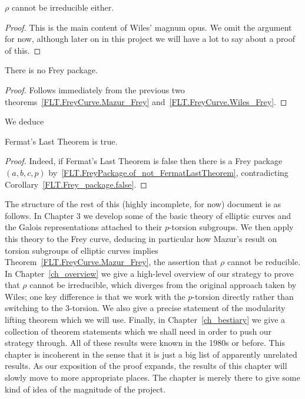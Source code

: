 \begin{theorem}\label{FLT.FreyCurve.Wiles_Frey}\leanok $\rho$ cannot be irreducible either.\end{theorem}
\begin{proof}\tangled This is the main content of Wiles' magnum opus. We omit the argument for now, although later on in this project we will have a lot to say about a proof of this.
\end{proof}

\begin{corollary}\label{FLT.Frey_package.false}\leanok There is no Frey package.\end{corollary}
\begin{proof}\leanok Follows immediately from the previous two theorems~\ref{FLT.FreyCurve.Mazur_Frey} and~\ref{FLT.FreyCurve.Wiles_Frey}.\end{proof}

We deduce

\begin{corollary}\label{FLT}\leanok Fermat's Last Theorem is true.\end{corollary}
\begin{proof}\leanok
Indeed, if Fermat's Last Theorem is false then there is a Frey package $(a,b,c,p)$ by~\ref{FLT.FreyPackage.of_not_FermatLastTheorem}, contradicting Corollary~\ref{FLT.Frey_package.false}.
\end{proof}

The structure of the rest of this (highly incomplete, for now) document is as follows. In Chapter 3 we develop some of the basic theory of elliptic curves and the Galois representations attached to their $p$-torsion subgroups. We then apply this theory to the Frey curve, deducing in particular how Mazur's result on torsion subgroups of elliptic curves implies Theorem~\ref{FLT.FreyCurve.Mazur_Frey}, the assertion that $\rho$ cannot be reducible. In Chapter~\ref{ch_overview} we give a high-level overview of our strategy to prove that $\rho$ cannot be irreducible, which diverges from the original approach taken by Wiles; one key difference is that we work with the $p$-torsion directly rather than switching to the 3-torsion. We also give a precise statement of the modularity lifting theorem which we will use. Finally, in Chapter~\ref{ch_bestiary} we give a collection of theorem statements which we shall need in order to push our strategy through. All of these results were known in the 1980s or before. This chapter is incoherent in the sense that it is just a big list of apparently unrelated results. As our exposition of the proof expands, the results of this chapter will slowly move to more appropriate places. The chapter is merely there to give some kind of idea of the magnitude of the project.
